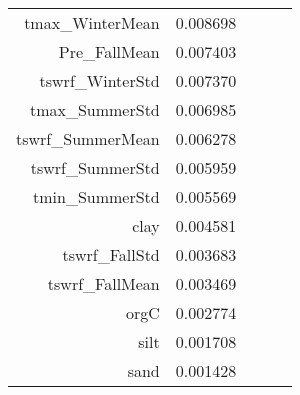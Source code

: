 \begin{tabular}{rrrrr}
tmax_WinterMean & 0.008698 \\
Pre_FallMean & 0.007403 \\
tswrf_WinterStd & 0.007370 \\
tmax_SummerStd & 0.006985 \\
tswrf_SummerMean & 0.006278 \\
tswrf_SummerStd & 0.005959 \\
tmin_SummerStd & 0.005569 \\
clay & 0.004581 \\
tswrf_FallStd & 0.003683 \\
tswrf_FallMean & 0.003469 \\
orgC & 0.002774 \\
silt & 0.001708 \\
sand & 0.001428 \\
\bottomrule
\end{tabular}
